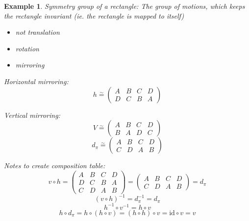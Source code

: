 \documentclass[a4paper,landscape,twocolumn]{article}
\newtheorem{ex}{Example}
\begin{document}
\begin{ex}
  \label{bsp-2-14}
  Symmetry group of a rectangle:
  The group of motions, which keeps the rectangle invariant
  (ie. the rectangle is mapped to itself)
  \begin{itemize}
    \item \emph{not} translation
    \item rotation
    \item mirroring
  \end{itemize}

  Horizontal mirroring:
  \[
    h \stackrel{\sim}{=}
    \begin{pmatrix}
      A & B & C & D \\
      D & C & B & A
    \end{pmatrix}
  \]

  Vertical mirroring:
  \[
    V \stackrel\sim=
    \begin{pmatrix}
      A & B & C & D \\
      B & A & D & C
    \end{pmatrix}
  \]
  \[
    d_\pi \stackrel\sim=
    \begin{pmatrix}
      A & B & C & D \\
      C & D & A & B
    \end{pmatrix}
  \]

  Notes to create composition table:
  \[
    v \circ h =
    \begin{pmatrix}
      A & B & C & D \\
      D & C & B & A \\
      C & D & A & B
    \end{pmatrix}
    = \begin{pmatrix}
      A & B & C & D \\
      C & D & A & B
    \end{pmatrix}
    = d_\pi
  \]
  \[ (v \circ h)^{-1} = d_\pi^{-1} = d_\pi \]
  \[ h^{-1} \circ v^{-1} = h \circ v \]
  \[ h \circ d_\pi = h\circ (h\circ v) = (h \circ h) \circ v = \text{id} \circ v = v \]


\end{ex}
\end{document}
